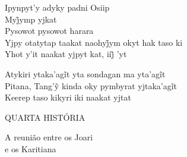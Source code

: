 \bigskip

\begin{linenumbers}\begingroup\raggedright
 
\noindent   Ipynpyt'y adyky padni Osiip\\
  Myj̃ymp yjkat\\
  Pysowot pysowot harara\\
  Yjpy otatytap taakat naohyj̃ym okyt hak taso ki\\
  Yhot y’it naakat yjpyt kat, iij̃ ’yt
 
\end{linenumbers}\endgroup

\bigskip

\begin{linenumbers}\begingroup\raggedright
 
\noindent   Atykiri ytaka’agĩt yta sondagan ma yta’agĩt\\
  Pitana, Tang’ỹ kinda oky pymbyrat yjtaka’agĩt\\
  Keerep taso kikyri iki naakat yjtat
\end{linenumbers}\endgroup


\blankpage
\pagebreak
\thispagestyle{empty}
\mbox{}
\begin{center}
\vspace{4cm}
{\formularlight\small QUARTA HISTÓRIA}

\medskip

{\formular\huge A reunião entre os Joari\\\vspace{0.2cm} e os Karitiana}
\end{center}
\pagebreak


